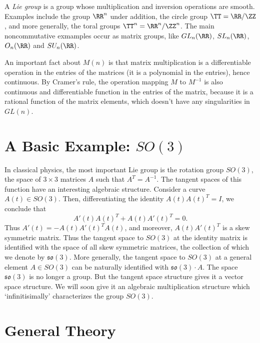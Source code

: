 A \emph{Lie group} is a group whose multiplication and inversion operations are smooth. Examples include the group $\RR^n$ under addition, the circle group $\TT = \RR/\ZZ$, and more generally, the toral groups $\TT^n = \RR^n / \ZZ^n$. The main noncommutative exmamples occur as matrix groups, like $GL_n(\RR)$, $SL_n(\RR)$, $O_n(\RR)$ and $SU_n(\RR)$.

An important fact about $M(n)$ is that matrix multiplication is a differentiable operation in the entries of the matrices (it is a polynomial in the entries), hence continuous. By Cramer's rule, the operation mapping $M$ to $M^{-1}$ is also continuous and differentiable function in the entries of the matrix, because it is a rational function of the matrix elements, which doesn't have any singularities in $GL(n)$.

\section{A Basic Example: $SO(3)$}

In classical physics, the most important Lie group is the rotation group $SO(3)$, the space of $3 \times 3$ matrices $A$ such that $A^T = A^{-1}$. The tangent spaces of this function have an interesting algebraic structure. Consider a curve $A(t) \in SO(3)$. Then, differentiating the identity $A(t) A(t)^T = I$, we conclude that
%
\[ A'(t) A(t)^T + A(t) A'(t)^T = 0. \]
%
Thus $A'(t) = - A(t) A'(t)^T A(t)$, and moreover, $A(t) A'(t)^T$ is a skew symmetric matrix. Thus the tangent space to $SO(3)$ at the identity matrix is identified with the space of all skew symmetric matrices, the collection of which we denote by $\mathfrak{so}(3)$. More generally, the tangent space to $SO(3)$ at a general element $A \in SO(3)$ can be naturally identified with $\mathfrak{so}(3) \cdot A$. The space $\mathfrak{so}(3)$ is no longer a group. But the tangent space structure gives it a vector space structure. We will soon give it an algebraic multiplication structure which `infinitisimally' characterizes the group $SO(3)$.

\section{General Theory}

